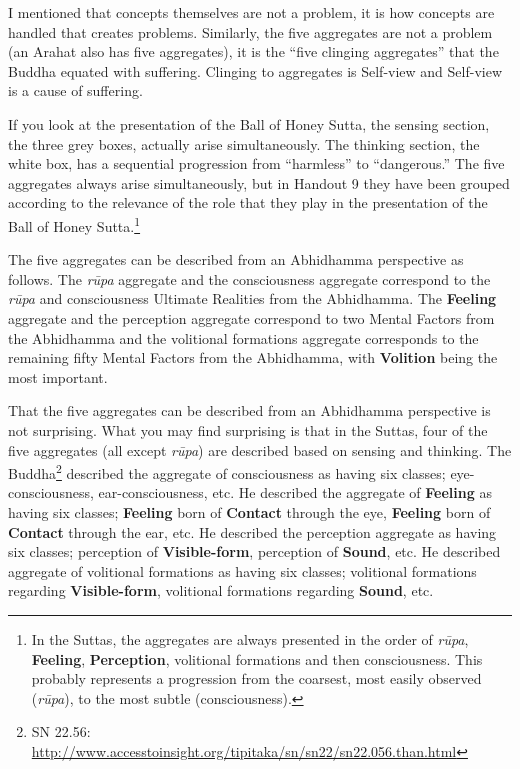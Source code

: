 I mentioned that concepts themselves are not a problem, it is how concepts are handled that creates problems. Similarly, the five aggregates are not a problem (an Arahat also has five aggregates), it is the “five clinging aggregates” that the Buddha equated with suffering. Clinging to aggregates is Self-view and Self-view is a cause of suffering.

If you look at the presentation of the Ball of Honey Sutta, the sensing section, the three grey boxes, actually arise simultaneously. The thinking section, the white box, has a sequential progression from “harmless” to “dangerous.” The five aggregates always arise simultaneously, but in Handout 9 they have been grouped according to the relevance of the role that they play in the presentation of the Ball of Honey Sutta.\footnote{In the Suttas, the aggregates are always presented in the order of \textit{rūpa}, \textbf{Feeling}, \textbf{Perception}, volitional formations and then consciousness. This probably represents a progression from the coarsest, most easily observed (\textit{rūpa}), to the most subtle (consciousness).}

The five aggregates can be described from an Abhidhamma perspective as follows. The \textit{rūpa} aggregate and the consciousness aggregate correspond to the \textit{rūpa} and consciousness Ultimate Realities from the Abhidhamma. The \textbf{Feeling} aggregate and the perception aggregate correspond to two Mental Factors from the Abhidhamma and the volitional formations aggregate corresponds to the remaining fifty Mental Factors from the Abhidhamma, with \textbf{Volition} being the most important.

That the five aggregates can be described from an Abhidhamma perspective is not surprising. What you may find surprising is that in the Suttas, four of the five aggregates (all except \textit{rūpa}) are described based on sensing and thinking. The Buddha\footnote{SN 22.56: \url{http://www.accesstoinsight.org/tipitaka/sn/sn22/sn22.056.than.html}} described the aggregate of consciousness as having six classes; eye-consciousness, ear-consciousness, etc. He described the aggregate of \textbf{Feeling} as having six classes; \textbf{Feeling} born of \textbf{Contact} through the eye, \textbf{Feeling} born of \textbf{Contact} through the ear, etc. He described the perception aggregate as having six classes; perception of \textbf{Visible-form}, perception of \textbf{Sound}, etc. He described aggregate of volitional formations as having six classes; volitional formations regarding \textbf{Visible-form}, volitional formations regarding \textbf{Sound}, etc.

